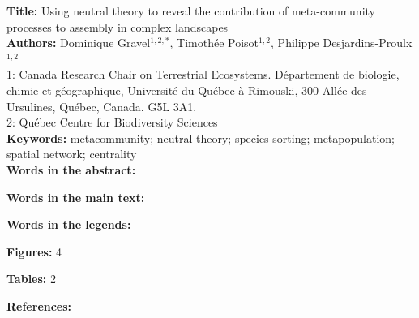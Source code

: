 \documentclass[12pt]{article}
\begin{document}
\linenumbers 
\modulolinenumbers[1]

\textbf{Title:} Using neutral theory to reveal the contribution of meta-community processes to assembly in complex landscapes\\

\textbf{Authors:} Dominique Gravel$^{1,2,*}$, Timoth\'ee Poisot$^{1,2}$, Philippe Desjardins-Proulx$^{1,2}$\\

1: Canada Research Chair on Terrestrial Ecosystems. D\'epartement de biologie, chimie et g\'eographique, Universit\'e du Qu\'ebec \`a Rimouski, 300 All\'ee des Ursulines, Qu\'ebec, Canada. G5L 3A1.\\

2: Qu\'ebec Centre for Biodiversity Sciences\\

\textbf{Keywords:} metacommunity; neutral theory; species sorting; metapopulation; spatial network; centrality \\

\textbf{Words in the abstract:}   

\textbf{Words in the main text:}  

\textbf{Words in the legends:}  

\textbf{Figures:} 4 

\textbf{Tables:} 2          

\textbf{References:}       

\newpage
\doublespacing

\end{document}
